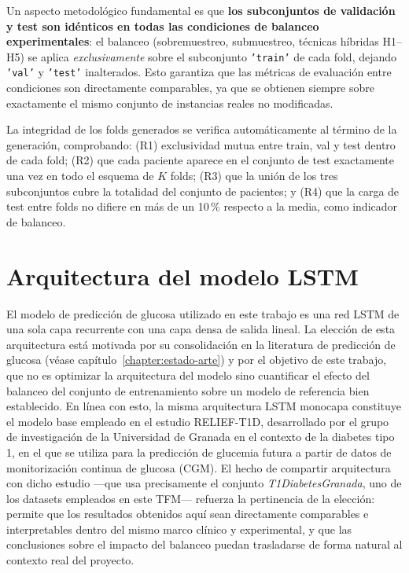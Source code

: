 Un aspecto metodológico fundamental es que \textbf{los subconjuntos de validación y test son idénticos en todas las condiciones de balanceo experimentales}: el balanceo (sobremuestreo, submuestreo, técnicas híbridas H1--H5) se aplica \emph{exclusivamente} sobre el subconjunto \texttt{'train'} de cada fold, dejando \texttt{'val'} y \texttt{'test'} inalterados. Esto garantiza que las métricas de evaluación entre condiciones son directamente comparables, ya que se obtienen siempre sobre exactamente el mismo conjunto de instancias reales no modificadas.

La integridad de los folds generados se verifica automáticamente al término de la
generación, comprobando: (R1) exclusividad mutua entre train, val y test dentro de cada fold; (R2) que cada paciente aparece en el conjunto de test exactamente una vez en todo el esquema de $K$ folds; (R3) que la unión de los tres subconjuntos cubre la totalidad del conjunto de pacientes; y (R4) que la carga de test entre folds no difiere en más de un 10\,\% respecto a la media, como indicador de balanceo.



\section{Arquitectura del modelo LSTM}
\label{sec:arquitectura_lstm}
El modelo de predicción de glucosa utilizado en este trabajo es una red LSTM de una sola capa recurrente con una capa densa de salida lineal. La elección de esta arquitectura está motivada por su consolidación en la literatura de predicción de glucosa (véase capítulo~\ref{chapter:estado-arte}) y por el objetivo de este trabajo, que no es optimizar la arquitectura del modelo sino cuantificar el efecto del balanceo del conjunto de entrenamiento sobre un modelo de referencia bien establecido. En línea con esto, la misma arquitectura LSTM monocapa constituye el modelo base empleado en el estudio RELIEF-T1D, desarrollado por el grupo de investigación de la Universidad de Granada en el contexto de la diabetes tipo 1, en el que se utiliza para la predicción de glucemia futura a partir de datos de monitorización continua de glucosa (CGM). El hecho de compartir arquitectura con dicho estudio —que usa precisamente el conjunto \textit{T1DiabetesGranada}, uno de los datasets empleados en este TFM— refuerza la pertinencia de la elección: permite que los resultados obtenidos aquí sean directamente comparables e interpretables dentro del mismo marco clínico y experimental, y que las conclusiones sobre el impacto del balanceo puedan trasladarse de forma natural al contexto real del proyecto.

